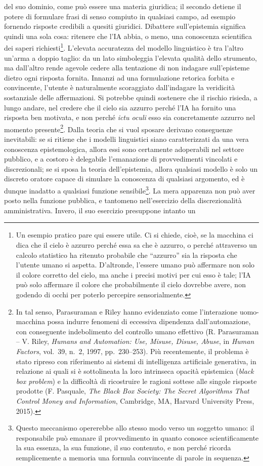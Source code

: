 \documentclass[american,a4paper,]{article}
\begin{document}
del suo dominio, come può essere una materia giuridica; il secondo detiene il potere di formulare frasi di senso compiuto in qualsiasi campo, ad esempio fornendo risposte credibili a quesiti giuridici. Dibattere sull'epistemia significa quindi una sola cosa: ritenere che l'IA abbia, o meno, una conoscenza scientifica dei saperi richiesti\footnote{Un esempio pratico pare qui essere utile. Ci si chiede, cioè, se la macchina ci dica che il cielo è azzurro perché essa sa che è azzurro, o perché attraverso un calcolo statistico ha ritenuto probabile che ``azzurro'' sia la risposta che l'utente umano si aspetta. D'altronde, l'essere umano può affermare non solo il colore corretto del cielo, ma anche i precisi motivi per cui esso è tale; l'IA può solo affermare il colore che probabilmente il cielo dovrebbe avere, non godendo di occhi per poterlo percepire sensorialmente.}. L'elevata accuratezza del modello linguistico è tra l'altro un'arma a doppio taglio: da un lato simboleggia l'elevata qualità dello strumento, ma dall'altro rende agevole cedere alla tentazione di non indagare sull'episteme dietro ogni risposta fornita. Innanzi ad una formulazione retorica forbita e convincente, l'utente è naturalmente scoraggiato dall'indagare la veridicità sostanziale delle affermazioni. Si potrebbe quindi sostenere che il rischio risieda, a lungo andare, nel credere che il cielo sia azzurro perché l'IA ha fornito una risposta ben motivata, e non perché \emph{ictu oculi} esso sia concretamente azzurro nel momento presente\footnote{In tal senso, Parasuraman e Riley hanno evidenziato come l'interazione uomo-macchina possa indurre fenomeni di eccessiva dipendenza dall'automazione, con conseguente indebolimento del controllo umano effettivo (R. Parasuraman -- V. Riley, \emph{Humans and Automation: Use, Misuse, Disuse, Abuse}, in \emph{Human Factors}, vol.~39, n.~2, 1997, pp.~230--253). Più recentemente, il problema è stato ripreso con riferimento ai sistemi di intelligenza artificiale generativa, in relazione ai quali si è sottolineata la loro intrinseca opacità epistemica (\emph{black box problem}) e la difficoltà di ricostruire le ragioni sottese alle singole risposte prodotte (F. Pasquale, \emph{The Black Box Society: The Secret Algorithms That Control Money and Information}, Cambridge, MA, Harvard University Press, 2015).}. Dalla teoria che si vuol sposare derivano conseguenze inevitabili: se si ritiene che i modelli linguistici siano caratterizzati da una vera conoscenza epistemologica, allora essi sono certamente adoperabili nel settore pubblico, e a costoro è delegabile l'emanazione di provvedimenti vincolati e discrezionali; se si sposa la teoria dell'epistemia, allora qualsiasi modello è solo un discreto oratore capace di simulare la conoscenza di qualsiasi argomento, ed è dunque inadatto a qualsiasi funzione sensibile\footnote{Questo meccanismo opererebbe allo stesso modo verso un soggetto umano: il responsabile può emanare il provvedimento in quanto conosce scientificamente la sua essenza, la sua funzione, il suo contenuto, e non perché ricorda semplicemente a memoria una formula convincente di parole in sequenza.}. La mera apparenza non può aver posto nella funzione pubblica, e tantomeno nell'esercizio della discrezionalità amministrativa. Invero, il suo esercizio presuppone intanto un 
\end{document}
